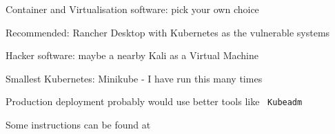 \documentclass[Screen16to9,17pt]{foils}
\begin{document}
\begin{list2}
\item Container and Virtualisation software: pick your own choice
\item Recommended: Rancher Desktop with Kubernetes as the vulnerable systems
\item Hacker software: maybe a nearby Kali as a Virtual Machine 
\item Smallest Kubernetes: Minikube -  I have run this many times
\item Production deployment probably would use better tools like \faWrench\ \verb+Kubeadm+
\item Some instructions can be found at 
\end{list2}












\end{document}
